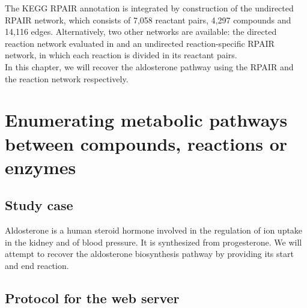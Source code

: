 The KEGG RPAIR annotation is integrated by construction of the undirected RPAIR network, which consists of 7,058 reactant pairs,
4,297 compounds and 14,116 edges. Alternatively, two other networks are available: the directed reaction network evaluated in
\cite{croes06} and an undirected reaction-specific RPAIR network, in which each reaction is divided in its reactant pairs.\\

In this chapter, we will recover the aldosterone pathway using the RPAIR and the reaction network respectively.

\section{Enumerating metabolic pathways between compounds, reactions or enzymes}

\subsection{Study case}

Aldosterone is a human steroid hormone involved in the regulation of ion uptake in the kidney and of blood pressure.
It is synthesized from progesterone. We will attempt to recover the aldosterone biosynthesis pathway by providing
its start and end reaction.

\subsection{Protocol for the web server}

